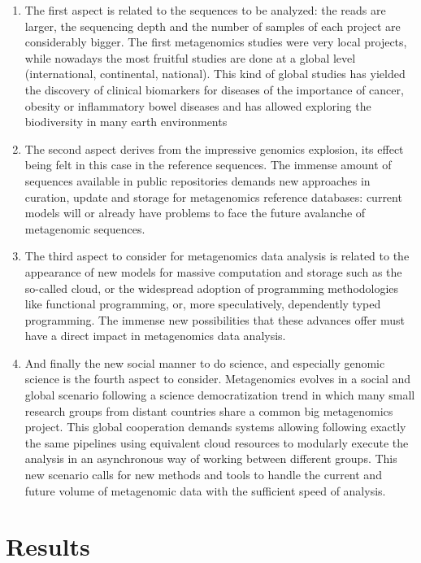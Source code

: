 \documentclass{frontiersSCNS} %
\providecommand{\tightlist}{%
\setlength{\itemsep}{0pt}\setlength{\parskip}{0pt}}
\begin{document}
\begin{enumerate}
\def\labelenumi{\roman{enumi}.}
\tightlist
\item
  The first aspect is related to the sequences to be analyzed: the reads
  are larger, the sequencing depth and the number of samples of each
  project are considerably bigger. The first metagenomics studies were
  very local projects, while nowadays the most fruitful studies are done
  at a global level (international, continental, national). This kind of
  global studies has yielded the discovery of clinical biomarkers for
  diseases of the importance of cancer, obesity or inflammatory bowel
  diseases and has allowed exploring the biodiversity in many earth
  environments
\item
  The second aspect derives from the impressive genomics explosion, its
  effect being felt in this case in the reference sequences. The immense
  amount of sequences available in public repositories demands new
  approaches in curation, update and storage for metagenomics reference
  databases: current models will or already have problems to face the
  future avalanche of metagenomic sequences.
\item
  The third aspect to consider for metagenomics data analysis is related
  to the appearance of new models for massive computation and storage
  such as the so-called cloud, or the widespread adoption of programming
  methodologies like functional programming, or, more speculatively,
  dependently typed programming. The immense new possibilities that
  these advances offer must have a direct impact in metagenomics data
  analysis.
\item
  And finally the new social manner to do science, and especially
  genomic science is the fourth aspect to consider. Metagenomics evolves
  in a social and global scenario following a science democratization
  trend in which many small research groups from distant countries share
  a common big metagenomics project. This global cooperation demands
  systems allowing following exactly the same pipelines using equivalent
  cloud resources to modularly execute the analysis in an asynchronous
  way of working between different groups. This new scenario calls for
  new methods and tools to handle the current and future volume of
  metagenomic data with the sufficient speed of analysis.
\end{enumerate}

\section{Results}\label{results}
\end{document}
